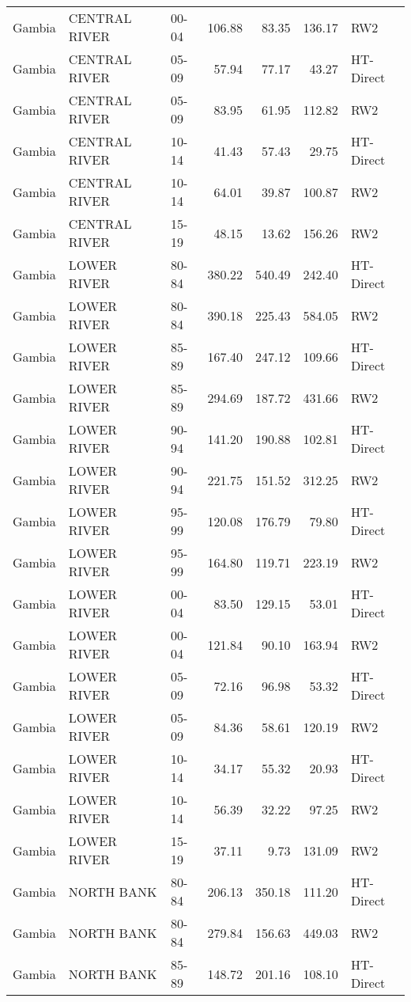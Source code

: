 \begin{longtable}{lllrrrl}
  Gambia & CENTRAL RIVER & 00-04 & 106.88 & 83.35 & 136.17 & RW2 \\ 
  Gambia & CENTRAL RIVER & 05-09 & 57.94 & 77.17 & 43.27 & HT-Direct \\ 
  Gambia & CENTRAL RIVER & 05-09 & 83.95 & 61.95 & 112.82 & RW2 \\ 
  Gambia & CENTRAL RIVER & 10-14 & 41.43 & 57.43 & 29.75 & HT-Direct \\ 
  Gambia & CENTRAL RIVER & 10-14 & 64.01 & 39.87 & 100.87 & RW2 \\ 
  Gambia & CENTRAL RIVER & 15-19 & 48.15 & 13.62 & 156.26 & RW2 \\ 
  Gambia & LOWER RIVER & 80-84 & 380.22 & 540.49 & 242.40 & HT-Direct \\ 
  Gambia & LOWER RIVER & 80-84 & 390.18 & 225.43 & 584.05 & RW2 \\ 
  Gambia & LOWER RIVER & 85-89 & 167.40 & 247.12 & 109.66 & HT-Direct \\ 
  Gambia & LOWER RIVER & 85-89 & 294.69 & 187.72 & 431.66 & RW2 \\ 
  Gambia & LOWER RIVER & 90-94 & 141.20 & 190.88 & 102.81 & HT-Direct \\ 
  Gambia & LOWER RIVER & 90-94 & 221.75 & 151.52 & 312.25 & RW2 \\ 
  Gambia & LOWER RIVER & 95-99 & 120.08 & 176.79 & 79.80 & HT-Direct \\ 
  Gambia & LOWER RIVER & 95-99 & 164.80 & 119.71 & 223.19 & RW2 \\ 
  Gambia & LOWER RIVER & 00-04 & 83.50 & 129.15 & 53.01 & HT-Direct \\ 
  Gambia & LOWER RIVER & 00-04 & 121.84 & 90.10 & 163.94 & RW2 \\ 
  Gambia & LOWER RIVER & 05-09 & 72.16 & 96.98 & 53.32 & HT-Direct \\ 
  Gambia & LOWER RIVER & 05-09 & 84.36 & 58.61 & 120.19 & RW2 \\ 
  Gambia & LOWER RIVER & 10-14 & 34.17 & 55.32 & 20.93 & HT-Direct \\ 
  Gambia & LOWER RIVER & 10-14 & 56.39 & 32.22 & 97.25 & RW2 \\ 
  Gambia & LOWER RIVER & 15-19 & 37.11 & 9.73 & 131.09 & RW2 \\ 
  Gambia & NORTH BANK & 80-84 & 206.13 & 350.18 & 111.20 & HT-Direct \\ 
  Gambia & NORTH BANK & 80-84 & 279.84 & 156.63 & 449.03 & RW2 \\ 
  Gambia & NORTH BANK & 85-89 & 148.72 & 201.16 & 108.10 & HT-Direct \\ 

\end{longtable}
